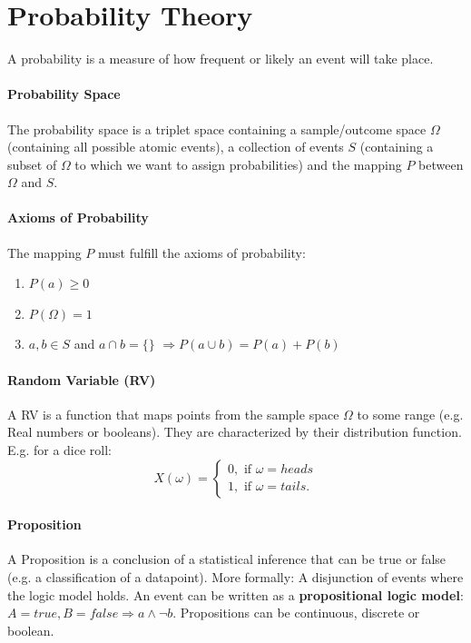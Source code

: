 \documentclass[../main.tex]{subfiles}
\begin{document}
\section{Probability Theory} \label{probability}
A probability is a measure of how frequent or likely an event will take place. 

\paragraph{Probability Space}  The probability space is a triplet space containing a sample/outcome space $\Omega$ (containing all possible atomic events), a collection of events $S$ (containing a subset of $\Omega$ to which we want to assign probabilities) and the mapping $P$ between $\Omega$ and $S$. 
\paragraph{Axioms of Probability}  The mapping $P$ must fulfill the axioms of probability: 
        \begin{enumerate}
            \item $P(a) \geq 0$
            \item $P(\Omega) = 1$
            \item $a,b \in S$ and $a \cap b = \{\}$ $ \Rightarrow P(a \cup b) = P(a) + P(b)$
        \end{enumerate}
\paragraph{Random Variable (RV)}  A RV is a function that maps points from the sample space $\Omega$ to some range (e.g. Real numbers or booleans). They are characterized by their distribution function. E.g. for a dice roll:
        \[ X(\omega) = \begin{cases} 
            0, \text{ if } \omega = heads\\
            1, \text{ if } \omega = tails.
        \end{cases}
        \]
\paragraph{Proposition}  A Proposition is a conclusion of a statistical inference that can be true or false (e.g. a classification of a datapoint). More formally: A disjunction of events where the logic model holds. An event can be written as a \textbf{propositional logic model}:\\ $A = true, B = false \Rightarrow a \land \neg b $. Propositions can be continuous, discrete or boolean. 
\end{document}
